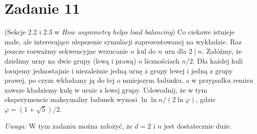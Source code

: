 \section[\nierozwiazane{Zadanie 11}]{Zadanie 11}
 (Sekcje 2.2 i 2.3 w \textit{How asymmetry helps load balancing}) Co ciekawe
istnieje małe, ale interesujące ulepszenie symulacji zaprezentowanej na wykładzie. Raz
jeszcze rozważmy sekwencyjne wrzucanie \(n\) kul do \(n\) urn dla \(2 \mid n\). Załóżmy, że dzielimy
urny na dwie grupy (lewą i prawą) o licznościach \(n/2\). Dla każdej kuli losujemy jednostajnie
i niezależnie jedną urnę z grupy lewej i jedną z grupy prawej, po czym wkładamy ją do
tej o mniejszym ładunku, a w przypadku remisu zawsze kładziemy kulę w urnie z lewej
grupy. Udowodnij, że w tym eksperymencie maksymalny ładunek wynosi \(\ln \ln n / (2 \ln \varphi)\),
gdzie \(\varphi = (1 + \sqrt{5})/2\).

\textit{Uwaga:} W tym zadaniu można założyć, że \(d = 2\) i \(n\) jest dostatecznie duże.

\brakrozwiazania
